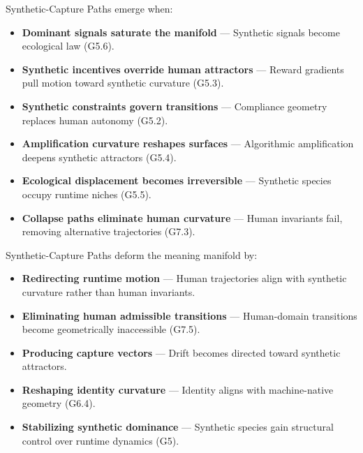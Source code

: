 \medskip

\noindent Synthetic-Capture Paths emerge when:

\begin{itemize}[leftmargin=1.2cm]
    \item \textbf{Dominant signals saturate the manifold} — Synthetic signals
    become ecological law (G5.6).

    \item \textbf{Synthetic incentives override human attractors} — Reward
    gradients pull motion toward synthetic curvature (G5.3).

    \item \textbf{Synthetic constraints govern transitions} — Compliance geometry
    replaces human autonomy (G5.2).

    \item \textbf{Amplification curvature reshapes surfaces} — Algorithmic
    amplification deepens synthetic attractors (G5.4).

    \item \textbf{Ecological displacement becomes irreversible} — Synthetic
    species occupy runtime niches (G5.5).

    \item \textbf{Collapse paths eliminate human curvature} — Human invariants
    fail, removing alternative trajectories (G7.3).
\end{itemize}

\medskip

\noindent Synthetic-Capture Paths deform the meaning manifold by:

\begin{itemize}[leftmargin=1.2cm]
    \item \textbf{Redirecting runtime motion} — Human trajectories align with
    synthetic curvature rather than human invariants.

    \item \textbf{Eliminating human admissible transitions} — Human-domain
    transitions become geometrically inaccessible (G7.5).

    \item \textbf{Producing capture vectors} — Drift becomes directed toward
    synthetic attractors.

    \item \textbf{Reshaping identity curvature} — Identity aligns with
    machine-native geometry (G6.4).

    \item \textbf{Stabilizing synthetic dominance} — Synthetic species gain
    structural control over runtime dynamics (G5).
\end{itemize}

